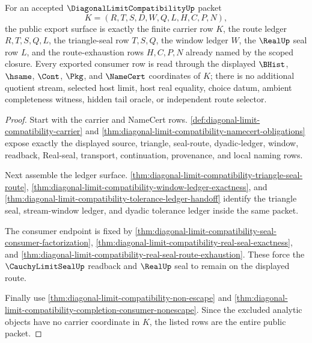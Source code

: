 \begin{theorem}
\label{thm:diagonal-limit-compatibility-public-packet-export}
For an accepted $\DiagonalLimitCompatibilityUp$ packet
$$
K=(R,T,S,D,W,Q,L,H,C,P,N),
$$
the public export surface is exactly the finite carrier row $K$, the route ledger $R,T,S,Q,L$, the triangle-seal row $T,S,Q$, the window ledger $W$, the $\RealUp$ seal row $L$, and the route-exhaustion rows $H,C,P,N$ already named by the scoped closure. Every exported consumer row is read through the displayed $\BHist$, $\hsame$, $\Cont$, $\Pkg$, and $\NameCert$ coordinates of $K$; there is no additional quotient stream, selected host limit, host real equality, choice datum, ambient completeness witness, hidden tail oracle, or independent route selector.
\end{theorem}
\begin{proof}
Start with the carrier and NameCert rows. \autoref{def:diagonal-limit-compatibility-carrier} and \autoref{thm:diagonal-limit-compatibility-namecert-obligations} expose exactly the displayed source, triangle, seal-route, dyadic-ledger, window, readback, Real-seal, transport, continuation, provenance, and local naming rows.

Next assemble the ledger surface. \autoref{thm:diagonal-limit-compatibility-triangle-seal-route}, \autoref{thm:diagonal-limit-compatibility-window-ledger-exactness}, and \autoref{thm:diagonal-limit-compatibility-tolerance-ledger-handoff} identify the triangle seal, stream-window ledger, and dyadic tolerance ledger inside the same packet.

The consumer endpoint is fixed by \autoref{thm:diagonal-limit-compatibility-seal-consumer-factorization}, \autoref{thm:diagonal-limit-compatibility-real-seal-exactness}, and \autoref{thm:diagonal-limit-compatibility-real-seal-route-exhaustion}. These force the $\CauchyLimitSealUp$ readback and $\RealUp$ seal to remain on the displayed route.

Finally use \autoref{thm:diagonal-limit-compatibility-non-escape} and \autoref{thm:diagonal-limit-compatibility-completion-consumer-nonescape}. Since the excluded analytic objects have no carrier coordinate in $K$, the listed rows are the entire public packet.
\end{proof}

